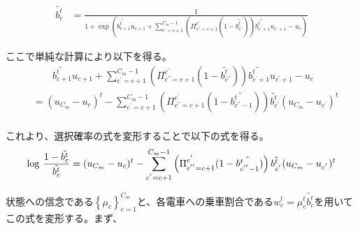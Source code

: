 \documentclass{jsarticle}
\begin{document}
\begin{align*}
	\tilde{b_c^t} &= \frac{1}{1 + \exp \left(\tilde{b_{c+1}^t} u_{c+1} + \sum_{c^{'}=c+1}^{C_m-1} \left( \Pi_{c^{''} = c+1}^{c^{'}} (1 - \tilde{b_{c^{''}}^t}) \right) \tilde{b_{c^{'} + 1}^t} u_{c^{'} + 1} - u_c \right)}
\end{align*}

ここで単純な計算により以下を得る。
\begin{align*}
	&\qquad \tilde{b_{c+1}^t} u_{c+1} + \sum_{c^{'}=c+1}^{C_m-1} \left( \Pi_{c^{''} = c+1}^{c^{'}} (1 - \tilde{b_{c^{''}}^t}) \right) \tilde{b_{c^{'} + 1}^t} u_{c^{'} + 1} - u_c\\[8pt]
	&= (u_{C_m} - u_c)^t - \sum_{c^{'} = c+1}^{C_m - 1} \left( \Pi_{c^{''} = c+1}^{c^{'}} (1 - \tilde{b_{c^{''} - 1}^t}) \right) \tilde{b_{c^{'}}^t} (u_{C_m} - u_{c^{'}})^t\\[8pt]
\end{align*}

これより、選択確率の式を変形することで以下の式を得る。
\begin{align}
	{\rm log}\ \frac{1 - \tilde{{b_c^t}}}{\tilde{b_c^t}} = (u_{C_m} - u_c)^t - \sum_{c^{'} = c+1}^{C_m - 1} \left( \Pi_{c^{''} = c+1}^{c^{'}} (1 - \tilde{b_{c^{''} - 1}^t}) \right) \tilde{b_{c^{'}}^t} (u_{C_m} - u_{c^{'}})^t
\end{align}

状態への信念である$\left\{ \mu_c \right\}_{c = 1}^{C_m}$と、各電車への乗車割合である$w_c^t = \mu_c^t \tilde{b_c^t}$を用いてこの式を変形する。まず、
\end{document}
